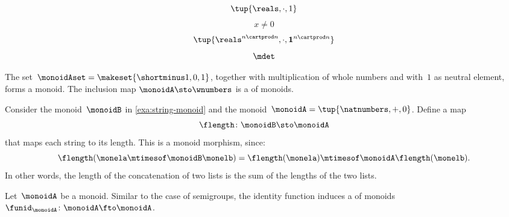 {\begin{forslides}
\begin{equation}
        \end{equation}
        \begin{equation}
            \label{eq:reals-times-one}
            \tup{\reals , \cdot, 1}
        \end{equation}
        \begin{equation}
            \label{eq:reals-times-one-non}
            x \neq 0
        \end{equation}
        \begin{equation}
            \label{eq:matrices-times}
            \tup{\reals^{n\cartprod n}, \cdot, \mathbf{1}^{n\cartprod n}}
        \end{equation}
        \begin{equation}
            \label{eq:det}
            \mdet
        \end{equation}
    \end{forslides}
}%

\begin{example}
    The set~$\monoidAset = \makeset{ \shortminus 1, 0, 1 }$, together with multiplication of whole numbers and with~$1$ as neutral element, forms a monoid.
    The inclusion map $\monoidA \sto \wnumbers$ is a \whomo of monoids.
\end{example}

\begin{example}
    \label{exa:string-length}
    Consider the monoid~$\monoidB$ in \cref{exa:string-monoid} and the monoid~$\monoidA=\tup{\natnumbers, +,0}$.
    Define a map
    \begin{equation}
        \flength \colon \monoidB \sto \monoidA
    \end{equation}
    that maps each string to its length.
    This is a monoid morphism, since:
    \begin{equation}
        \flength(\monela \mtimesof\monoidB \monelb)=\flength(\monela)\mtimesof\monoidA \flength(\monelb).
    \end{equation}
    In other words, the length of the concatenation of two lists is the sum of the lengths of the two lists.
\end{example}

\begin{ctdefinition}
    \label{def:identity-mon-mor}
    Let~$\monoidA$ be a monoid.
    Similar to the case of semigroups, the identity function induces a \whomo of monoids~$\funid_\monoidA\colon \monoidA \fto \monoidA$.
\end{ctdefinition}


